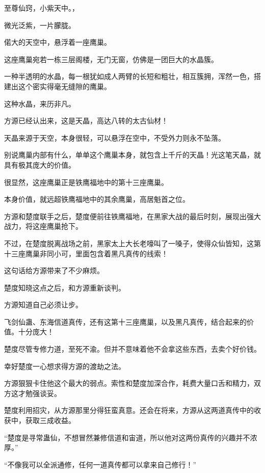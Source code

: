
\begin{this_body}



至尊仙窍，小紫天中。，

微光泛紫，一片朦胧。

偌大的天空中，悬浮着一座鹰巢。

这座鹰巢宛若一栋三层阁楼，无门无窗，仿佛是一团巨大的水晶簇。

一种半透明的水晶，每一根犹如成人两臂的长短和粗壮，相互簇拥，浑然一色，搭建出这个密实得毫无缝隙的鹰巢。

这种水晶，来历非凡。

方源已经认出来，这是天晶，高达八转的太古仙材！

天晶来源于天空，本身很轻，可以悬浮在空中，不受外力则永不坠落。

别说鹰巢内部有什么，单单这个鹰巢本身，就包含上千斤的天晶！光这笔天晶，就具有极其庞大的价值。

很显然，这座鹰巢正是铁鹰福地中的第十三座鹰巢。

本身价值，就远超铁鹰福地中的其余鹰巢，高居魁首之位。

方源和楚度联手之后，楚度便前往铁鹰福地，在黑家大战的最后时刻，展现出强大战力，将这座鹰巢抢下。

不过，在楚度脱离战场之前，黑家太上大长老嚎叫了一嗓子，使得众仙皆知，这第十三座鹰巢非同小可，里面包含着黑凡真传的线索！

这句话给方源带来了不少麻烦。

楚度知晓这点之后，和方源重新谈判。

方源知道自己必须让步。

飞剑仙蛊、东海信道真传，还有这第十三座鹰巢，以及黑凡真传，结合起来的价值。十分庞大！

楚度尽管专修力道，至死不渝。但并不意味着他不会拿这些东西，去卖个好价钱。

幸好楚度一心想求得方源的渡劫之法。

方源狠狠卡住他这个最大的弱点。索性和楚度加深合作，耗费大量口舌和精力，双方这才勉强谈妥。

楚度利用招灾，从方源那里分得狂蛮真意。还会在将来，方源从这两道真传中的收获中，获取三成收益。

“楚度是寻常蛊仙，不想冒然兼修信道和宙道，所以他对这两份真传的兴趣并不浓厚。”

“不像我可以全派通修，任何一道真传都可以拿来自己修行！”


\end{this_body}
